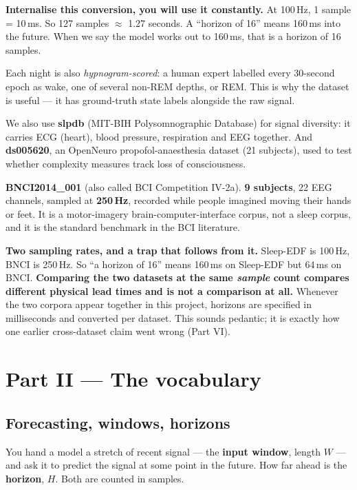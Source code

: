 \documentclass[11pt]{article}
\begin{document}
\begin{keybox}
\textbf{Internalise this conversion, you will use it constantly.} At 100\,Hz,
1 sample = 10\,ms. So 127 samples $\approx$ 1.27 seconds. A ``horizon of 16''
means 160\,ms into the future. When we say the model works out to 160\,ms, that
is a horizon of 16 samples.
\end{keybox}

Each night is also \emph{hypnogram-scored}: a human expert labelled every
30-second epoch as wake, one of several non-REM depths, or REM. This is why the
dataset is useful --- it has ground-truth state labels alongside the raw signal.

We also use \textbf{slpdb} (MIT-BIH Polysomnographic Database) for signal
diversity: it carries ECG (heart), blood pressure, respiration and EEG together.
And \textbf{ds005620}, an OpenNeuro propofol-anaesthesia dataset (21 subjects),
used to test whether complexity measures track loss of consciousness.

\textbf{BNCI2014\_001} (also called BCI Competition IV-2a). \textbf{9 subjects},
22 EEG channels, sampled at \textbf{250\,Hz}, recorded while people imagined
moving their hands or feet. It is a motor-imagery brain-computer-interface
corpus, not a sleep corpus, and it is the standard benchmark in the BCI
literature.

\begin{keybox}
\textbf{Two sampling rates, and a trap that follows from it.} Sleep-EDF is
100\,Hz, BNCI is 250\,Hz. So ``a horizon of 16'' means 160\,ms on Sleep-EDF but
64\,ms on BNCI. \textbf{Comparing the two datasets at the same \emph{sample}
count compares different physical lead times and is not a comparison at all.}
Whenever the two corpora appear together in this project, horizons are specified
in milliseconds and converted per dataset. This sounds pedantic; it is exactly
how one earlier cross-dataset claim went wrong (Part VI).
\end{keybox}

\section{Part II --- The vocabulary}

\subsection{Forecasting, windows, horizons}

You hand a model a stretch of recent signal --- the \textbf{input window}, length
$W$ --- and ask it to predict the signal at some point in the future. How far
ahead is the \textbf{horizon}, $H$. Both are counted in samples.
\end{document}
